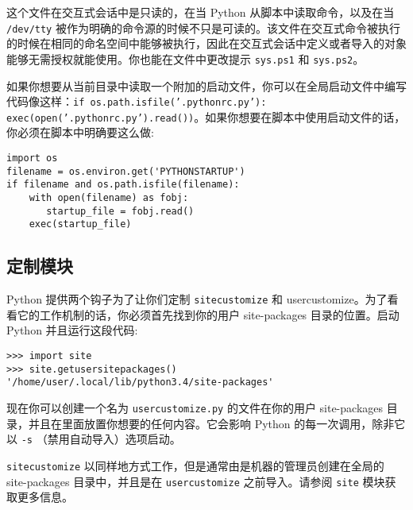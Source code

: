 这个文件在交互式会话中是只读的，在当 Python 从脚本中读取命令，以及在当 \texttt{/dev/tty} 被作为明确的命令源的时候不只是可读的。该文件在交互式命令被执行的时候在相同的命名空间中能够被执行，因此在交互式会话中定义或者导入的对象能够无需授权就能使用。你也能在文件中更改提示 \texttt{sys.ps1} 和 \texttt{sys.ps2}。

如果你想要从当前目录中读取一个附加的启动文件，你可以在全局启动文件中编写代码像这样：\texttt{if os.path.isfile('.pythonrc.py'): exec(open('.pythonrc.py').read())}。如果你想要在脚本中使用启动文件的话，你必须在脚本中明确要这么做:
\begin{lstlisting}
import os
filename = os.environ.get('PYTHONSTARTUP')
if filename and os.path.isfile(filename):
    with open(filename) as fobj:
       startup_file = fobj.read()
    exec(startup_file)
\end{lstlisting}
\subsection{定制模块}
Python 提供两个钩子为了让你们定制 \texttt{sitecustomize} 和 {usercustomize}。为了看看它的工作机制的话，你必须首先找到你的用户 site-packages 目录的位置。启动 Python 并且运行这段代码:
\begin{lstlisting}
>>> import site
>>> site.getusersitepackages()
'/home/user/.local/lib/python3.4/site-packages'
\end{lstlisting}
现在你可以创建一个名为 \texttt{usercustomize.py} 的文件在你的用户 site-packages 目录，并且在里面放置你想要的任何内容。它会影响 Python 的每一次调用，除非它以 \texttt{-s} （禁用自动导入）选项启动。

\texttt{sitecustomize} 以同样地方式工作，但是通常由是机器的管理员创建在全局的 site-packages 目录中，并且是在 \texttt{usercustomize} 之前导入。请参阅 \texttt{site} 模块获取更多信息。